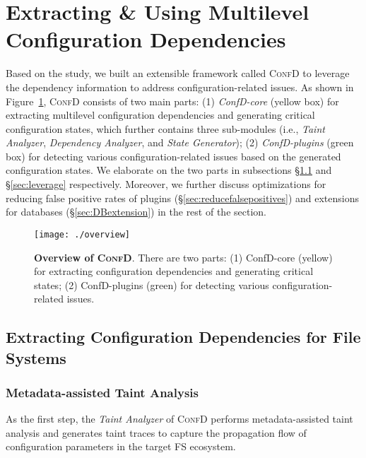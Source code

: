 \section{Extracting \& Using Multilevel Configuration Dependencies}
\label{sec:design-extract}

 Based on the study, we built an extensible framework called \textsc{ConfD} to leverage the  dependency information to address configuration-related issues. 
As shown in Figure~\ref{fig:overview},   \textsc{ConfD}   consists of two main  parts:  (1) \textit{ConfD-core} (yellow box) for extracting multilevel  configuration dependencies and generating critical configuration states, which further contains three sub-modules (i.e., \textit{Taint Analyzer}, \textit{Dependency Analyzer}, and \textit{State Generator});
(2) \textit{ConfD-plugins} (green box) for detecting various  configuration-related issues based on the generated configuration states. We elaborate on the two parts in subsections \S\ref{sec:extraction} and  \S\ref{sec:leverage} respectively. Moreover, we further discuss optimizations for reducing false positive rates of plugins (\S\ref{sec:reducefalsepositives}) and  extensions for databases (\S\ref{sec:DBextension})  in the rest of the section.
 
 \begin{figure}[tb]
	\centering
    \texttt{[image: ./overview]}
    \vspace{-0.1in}
	\caption{  {\bf Overview of \textsc{ConfD}}. {There are two parts: (1) ConfD-core (yellow) for extracting  configuration dependencies and generating critical states; (2) ConfD-plugins (green) for detecting various configuration-related issues.} 
	}
	\label{fig:overview}
\end{figure}



 \subsection{Extracting Configuration Dependencies for File Systems}
 \label{sec:extraction}
  

\subsubsection{Metadata-assisted Taint Analysis}
\label{sec:derive}

As the first step, the \textit{Taint Analyzer} of  \textsc{ConfD} performs metadata-assisted taint analysis and generates taint traces to capture the propagation flow of configuration parameters in the target FS ecosystem.

